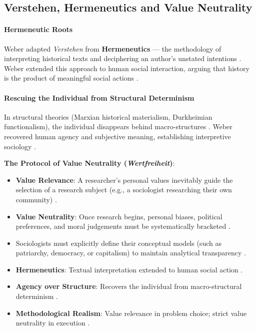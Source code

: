 \subsection{Verstehen, Hermeneutics and Value Neutrality}

\paragraph{Hermeneutic Roots}
Weber adapted \textit{Verstehen} from \textbf{Hermeneutics} --- the methodology of interpreting historical texts and deciphering an author's unstated intentions . Weber extended this approach to human social interaction, arguing that history is the product of meaningful social actions .

\paragraph{Rescuing the Individual from Structural Determinism}
In structural theories (Marxian historical materialism, Durkheimian functionalism), the individual disappears behind macro-structures . Weber recovered human agency and subjective meaning, establishing interpretive sociology .

\begin{KeyConcept}
\textbf{The Protocol of Value Neutrality (\textit{Wertfreiheit})}:
\begin{itemize}
    \item \textbf{Value Relevance}: A researcher's personal values inevitably guide the selection of a research subject (e.g., a sociologist researching their own community) .
    \item \textbf{Value Neutrality}: Once research begins, personal biases, political preferences, and moral judgements must be systematically bracketed .
    \item Sociologists must explicitly define their conceptual models (such as patriarchy, democracy, or capitalism) to maintain analytical transparency .
\end{itemize}
\end{KeyConcept}

\begin{QuickRevision}
\begin{itemize}
    \item \textbf{Hermeneutics}: Textual interpretation extended to human social action .
    \item \textbf{Agency over Structure}: Recovers the individual from macro-structural determinism .
    \item \textbf{Methodological Realism}: Value relevance in problem choice; strict value neutrality in execution .
\end{itemize}
\end{QuickRevision}

